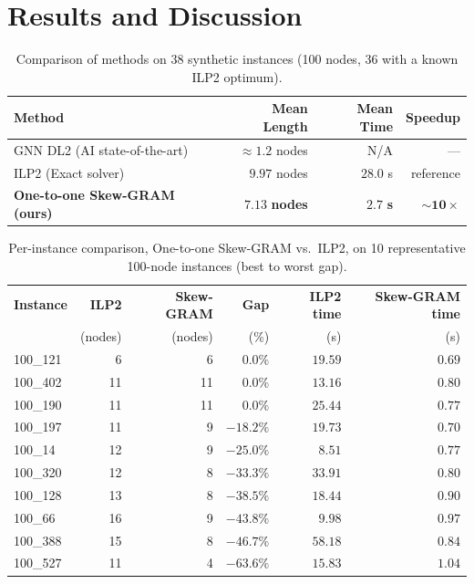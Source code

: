 \documentclass{llncs}
\begin{document}
\section{Results and Discussion}

\begin{table}[htbp]
\centering
\caption{Comparison of methods on 38 synthetic instances (100 nodes, 36 with a known ILP2 optimum).}
\label{tab:results}
\begin{tabular}{lrrr}
\toprule
\textbf{Method} & \textbf{Mean Length} & \textbf{Mean Time} & \textbf{Speedup} \\
\midrule
GNN DL2 \cite{sidi} (AI state-of-the-art) & $\approx 1.2$ nodes & N/A & — \\
ILP2 \cite{sidi} (Exact solver) & $9.97$ nodes & $28.0$ s & reference \\
\textbf{One-to-one Skew-GRAM (ours)} & $\mathbf{7.13}$ \textbf{nodes} & $\mathbf{2.7}$ \textbf{s} & $\mathbf{\sim 10\times}$ \\
\bottomrule
\end{tabular}
\end{table}

\begin{table}[htbp]
\centering
\caption{Per-instance comparison, One-to-one Skew-GRAM vs.\ ILP2, on 10 representative 100-node instances (best to worst gap).}
\label{tab:per-instance}
\begin{tabular}{lrrrrr}
\toprule
\textbf{Instance} & \textbf{ILP2} & \textbf{Skew-GRAM} & \textbf{Gap} & \textbf{ILP2 time} & \textbf{Skew-GRAM time} \\
 & (nodes) & (nodes) & (\%) & (s) & (s) \\
\midrule
100\_121 & 6  & 6  & $0.0\%$   & $19.59$ & $0.69$ \\
100\_402 & 11 & 11 & $0.0\%$   & $13.16$ & $0.80$ \\
100\_190 & 11 & 11 & $0.0\%$   & $25.44$ & $0.77$ \\
100\_197 & 11 & 9  & $-18.2\%$ & $19.73$ & $0.70$ \\
100\_14  & 12 & 9  & $-25.0\%$ & $8.51$  & $0.77$ \\
100\_320 & 12 & 8  & $-33.3\%$ & $33.91$ & $0.80$ \\
100\_128 & 13 & 8  & $-38.5\%$ & $18.44$ & $0.90$ \\
100\_66  & 16 & 9  & $-43.8\%$ & $9.98$  & $0.97$ \\
100\_388 & 15 & 8  & $-46.7\%$ & $58.18$ & $0.84$ \\
100\_527 & 11 & 4  & $-63.6\%$ & $15.83$ & $1.04$ \\
\bottomrule
\end{tabular}
\end{table}
\end{document}
